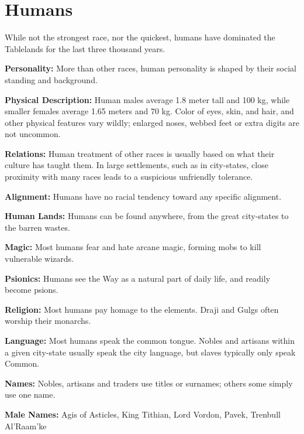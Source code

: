 \section{Humans}

While not the strongest race, nor the quickest, humans have dominated the Tablelands for the last three thousand years.

\textbf{Personality:} More than other races, human personality is shaped by their social standing and background.


\textbf{Physical Description:} Human males average 1.8 meter tall and 100 kg, while smaller females average 1.65 meters and 70 kg. Color of eyes, skin, and hair, and other physical features vary wildly; enlarged noses, webbed feet or extra digits are not uncommon.

\textbf{Relations:} Human treatment of other races is usually based on what their culture has taught them. In large settlements, such as in city-states, close proximity with many races leads to a suspicious unfriendly tolerance.

\textbf{Alignment:} Humans have no racial tendency toward any specific alignment.

\textbf{Human Lands:} Humans can be found anywhere, from the great city-states to the barren wastes.

\textbf{Magic:} Most humans fear and hate arcane magic, forming mobs to kill vulnerable wizards.

\textbf{Psionics:} Humans see the Way as a natural part of daily life, and readily become psions.

\textbf{Religion:} Most humans pay homage to the elements. Draji and Gulgs often worship their monarchs.

\textbf{Language:} Most humans speak the common tongue. Nobles and artisans within a given city-state usually speak the city language, but slaves typically only speak Common.

\textbf{Names:} Nobles, artisans and traders use titles or surnames; others some simply use one name.

\textbf{Male Names:} Agis of Asticles, King Tithian, Lord Vordon, Pavek, Trenbull Al'Raam'ke

